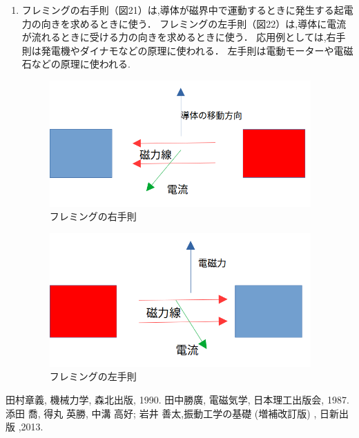 \documentclass[a4paper,10.5pt]{jsarticle}
\begin{document}
\begin{enumerate}
  \item 
  フレミングの右手則（図21）は,導体が磁界中で運動するときに発生する起電力の向きを求めるときに使う．
  フレミングの左手則（図22）は,導体に電流が流れるときに受ける力の向きを求めるときに使う．
  応用例としては,右手則は発電機やダイナモなどの原理に使われる．
  左手則は電動モーターや電磁石などの原理に使われる. 
  \newpage
  \begin{figure}[h]
    \centering
    \includegraphics[width=10cm]{12.png}
    \caption{フレミングの右手則}
  \end{figure}
  \begin{figure}[h]
    \centering
    \includegraphics[width=10cm]{13.png}
    \caption{フレミングの左手則}
  \end{figure}
\end{enumerate}

\begin{thebibliography}{20}
  \bibitem{} 
  田村章義, 機械力学, 森北出版, 1990.
  \bibitem{}
  田中勝廣, 電磁気学, 日本理工出版会, 1987.
  \bibitem{}
  添田 喬, 得丸 英勝, 中溝 高好; 岩井 善太,振動工学の基礎 (増補改訂版)  , 日新出版 ,2013. 
 \end{thebibliography}
\end{document}
